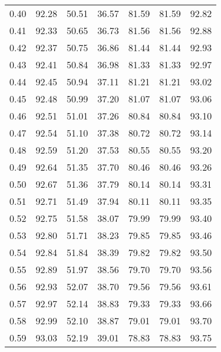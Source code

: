 \begin{tabular}{|c|c|c|c|c|c|c|}
      0.40 &     92.28 &     50.51 &      36.57 &   81.59 &      81.59 &         92.82 \\
      0.41 &     92.33 &     50.65 &      36.73 &   81.56 &      81.56 &         92.88 \\
      0.42 &     92.37 &     50.75 &      36.86 &   81.44 &      81.44 &         92.93 \\
      0.43 &     92.41 &     50.84 &      36.98 &   81.33 &      81.33 &         92.97 \\
      0.44 &     92.45 &     50.94 &      37.11 &   81.21 &      81.21 &         93.02 \\
      0.45 &     92.48 &     50.99 &      37.20 &   81.07 &      81.07 &         93.06 \\
      0.46 &     92.51 &     51.01 &      37.26 &   80.84 &      80.84 &         93.10 \\
      0.47 &     92.54 &     51.10 &      37.38 &   80.72 &      80.72 &         93.14 \\
      0.48 &     92.59 &     51.20 &      37.53 &   80.55 &      80.55 &         93.20 \\
      0.49 &     92.64 &     51.35 &      37.70 &   80.46 &      80.46 &         93.26 \\
      0.50 &     92.67 &     51.36 &      37.79 &   80.14 &      80.14 &         93.31 \\
      0.51 &     92.71 &     51.49 &      37.94 &   80.11 &      80.11 &         93.35 \\
      0.52 &     92.75 &     51.58 &      38.07 &   79.99 &      79.99 &         93.40 \\
      0.53 &     92.80 &     51.71 &      38.23 &   79.85 &      79.85 &         93.46 \\
      0.54 &     92.84 &     51.84 &      38.39 &   79.82 &      79.82 &         93.50 \\
      0.55 &     92.89 &     51.97 &      38.56 &   79.70 &      79.70 &         93.56 \\
      0.56 &     92.93 &     52.07 &      38.70 &   79.56 &      79.56 &         93.61 \\
      0.57 &     92.97 &     52.14 &      38.83 &   79.33 &      79.33 &         93.66 \\
      0.58 &     92.99 &     52.10 &      38.87 &   79.01 &      79.01 &         93.70 \\
      0.59 &     93.03 &     52.19 &      39.01 &   78.83 &      78.83 &         93.75 \\

\end{tabular}
